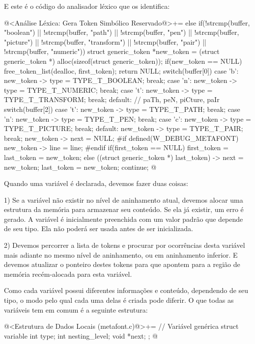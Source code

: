 E este é o código do analisador léxico que os identifica:

\iniciocodigo
@<Análise Léxica: Gera Token Simbólico Reservado@>+=
else if(!strcmp(buffer, "boolean") || !strcmp(buffer, "path") ||
        !strcmp(buffer, "pen") || !strcmp(buffer, "picture") ||
        !strcmp(buffer, "transform") || !strcmp(buffer, "pair") ||
        !strcmp(buffer, "numeric")){
  struct generic_token *new_token =
     (struct generic_token *) alloc(sizeof(struct generic_token));
  if(new_token == NULL){
    free_token_list(dealloc, first_token);
    return NULL;
  }
  switch(buffer[0]){
  case 'b':
    new_token -> type = TYPE_T_BOOLEAN; break;
  case 'n':
    new_token -> type = TYPE_T_NUMERIC; break;    
  case 't':
    new_token -> type = TYPE_T_TRANSFORM; break;
  default: // paTh, peN, piCture, paIr
    switch(buffer[2]){
      case 't':
        new_token -> type = TYPE_T_PATH; break;
      case 'n':
        new_token -> type = TYPE_T_PEN; break;
      case 'c':
        new_token -> type = TYPE_T_PICTURE; break;
      default:
        new_token -> type = TYPE_T_PAIR; break;
    }
  }
  new_token -> next = NULL;
#if defined(W_DEBUG_METAFONT)
  new_token -> line = line;
#endif
  if(first_token == NULL)
    first_token = last_token = new_token;
  else{
    ((struct generic_token *) last_token) -> next = new_token;
    last_token = new_token;
  }
  continue;
}
@
\fimcodigo

Quando uma variável é declarada, devemos fazer duas coisas:

1) Se a variável não existir no nível de aninhamento atual, devemos
alocar uma estrutura da memória para armazenar seu conteúdo. Se ela já
existir, um erro é gerado. A variável é inicialmente preenchida com um
valor padrão que depende de seu tipo. Ela não poderá ser usada antes
de ser inicializada.

2) Devemos percorrer a lista de tokens e procurar por ocorrências
desta variável mais adiante no mesmo nível de aninhamento, ou em
aninhamento inferior. E devemos atualizar o ponteiro destes tokens
para que apontem para a região de memória recém-alocada para esta
variável.

Como cada variável possui diferentes informações e conteúdo,
dependendo de seu tipo, o modo pelo qual cada uma delas é criada pode
diferir. O que todas as variáveis tem em comum é a seguinte estrutura:

\iniciocodigo
@<Estrutura de Dados Locais (metafont.c)@>+=
// Variável genérica
struct variable{
  int type;
  int nesting_level;
  void *next;  
};
@
\fimcodigo

